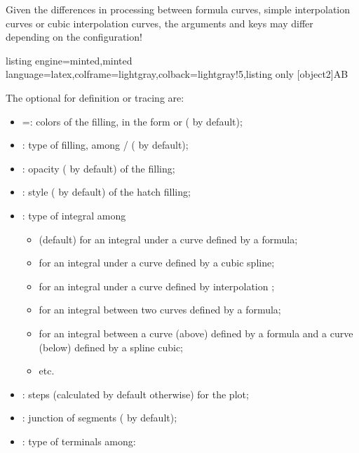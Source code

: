 \documentclass[11pt,a4paper]{ltxdoc}
\begin{document}
\smallskip

{\small\faBomb} Given the differences in processing between formula curves, simple interpolation curves or cubic interpolation curves, the arguments and keys may differ depending on the configuration!

\begin{tcblisting}{listing engine=minted,minted language=latex,colframe=lightgray,colback=lightgray!5,listing only}
[object2]{A}{B}
\end{tcblisting}

The optional \MontreCode{[keys]} for definition or tracing are:

\begin{itemize}
	\item {} =: colors of the filling, in the form  or  ( by default);
	\item {}: type of filling, among / ( by default);
	\item {}: opacity ( by default) of the filling;
	\item {}: style ( by default) of the hatch filling;
	\item {}: type of integral among
	\begin{itemize}
		\item {} (default) for an integral under a curve defined by a formula;
		\item {} for an integral under a curve defined by a cubic spline;
		\item {} for an integral under a curve defined by interpolation ;
		\item {} for an integral between two curves defined by a formula;
		\item {} for an integral between a curve (above) defined by a formula and a curve (below) defined by a spline cubic;
		\item etc.
	\end{itemize}
	\item {}: steps (calculated by default otherwise) for the plot;
	\item {}: junction of segments ( by default);
	\item {}: type of terminals among:

\end{itemize}
\end{document}
